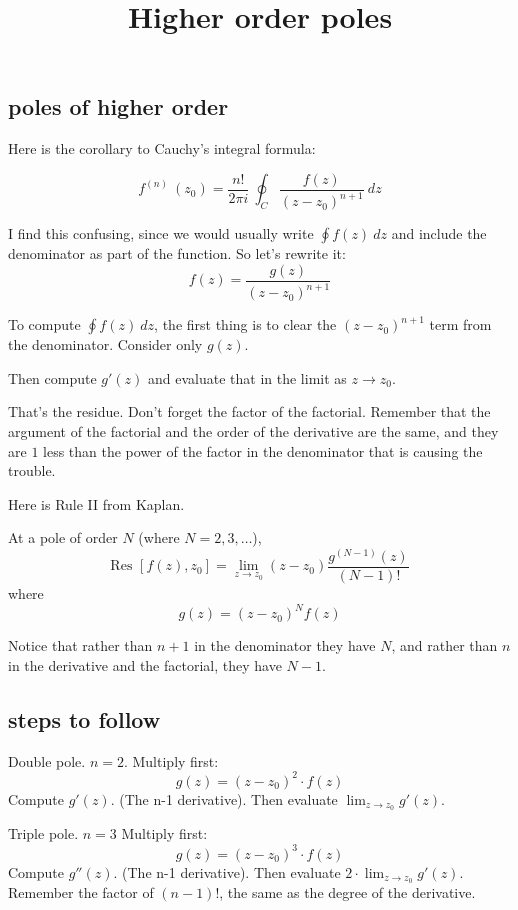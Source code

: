 \documentclass[11pt, oneside]{article}
\title{Higher order poles}
\date{}
\begin{document}
\maketitle
\Large


\subsection*{poles of higher order}

Here is the corollary to Cauchy's integral formula:

\[ f^{(n)} \ (z_0) = \frac{n!}{2 \pi i} \ \oint_C \frac{f(z)}{(z-z_0)^{n+1}} \ dz \]

I find this confusing, since we would usually write $\oint f(z) \ dz$ and include the denominator as part of the function.  So let's rewrite it:
\[ f(z) = \frac{g(z)}{(z - z_0)^{n+1}} \]

To compute $\oint f(z) \ dz$, the first thing is to clear the $(z-z_0)^{n+1}$ term from the denominator.  Consider only $g(z)$.

Then compute $g'(z)$ and evaluate that in the limit as $z \rightarrow z_0$.  \

That's the residue.  Don't forget the factor of the factorial.  Remember that the argument of the factorial and the order of the derivative are the same, and they are $1$ less than the power of the factor in the denominator that is causing the trouble.

Here is Rule II from Kaplan.

At a pole of order $N$ (where $N = 2, 3, \dots$),
\[ \text{Res } [f(z),z_0] = \lim_{z \rightarrow z_0} (z-z_0) \frac{g^{(N-1)}(z)}{(N-1)!} \]
where 
\[ g(z) = (z-z_0)^N f(z) \]

Notice that rather than $n+1$ in the denominator they have $N$, and rather than $n$ in the derivative and the factorial, they have $N-1$.

\subsection*{steps to follow}

Double pole. $n = 2$.  Multiply first:
\[ g(z) = (z - z_0)^2 \cdot f(z) \]
Compute $g'(z)$.  (The n-1 derivative).  Then evaluate $\lim_{z \rightarrow z_0} g'(z)$.

Triple pole. $n = 3$  Multiply first:
\[ g(z) = (z - z_0)^3 \cdot f(z) \]
Compute $g''(z)$.  (The n-1 derivative).  Then evaluate $2 \cdot \lim_{z \rightarrow z_0} g'(z)$.  
Remember the factor of $(n-1)!$, the same as the degree of the derivative. 
\end{document}
